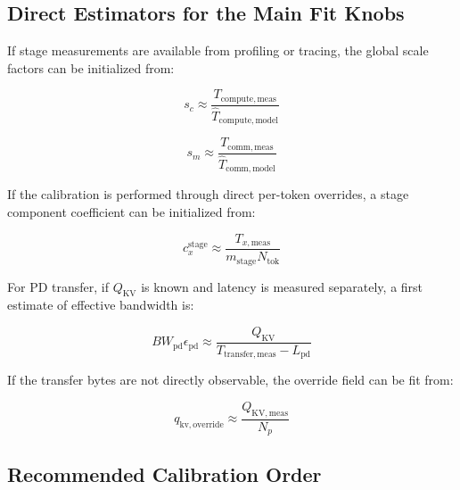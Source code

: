 \subsection{Direct Estimators for the Main Fit Knobs}

If stage measurements are available from profiling or tracing, the global scale
factors can be initialized from:

\begin{equation*}
s_c \approx
\frac{T_{\mathrm{compute,meas}}}
{\widehat{T}_{\mathrm{compute,model}}}
\end{equation*}

\begin{equation*}
s_m \approx
\frac{T_{\mathrm{comm,meas}}}
{\widehat{T}_{\mathrm{comm,model}}}
\end{equation*}

If the calibration is performed through direct per-token overrides, a stage
component coefficient can be initialized from:

\begin{equation*}
c_x^{\mathrm{stage}} \approx
\frac{T_{x,\mathrm{meas}}}
{m_{\mathrm{stage}} N_{\mathrm{tok}}}
\end{equation*}

For PD transfer, if \(Q_{\mathrm{KV}}\) is known and latency is measured
separately, a first estimate of effective bandwidth is:

\begin{equation*}
BW_{\mathrm{pd}} \epsilon_{\mathrm{pd}} \approx
\frac{Q_{\mathrm{KV}}}
{T_{\mathrm{transfer,meas}} - L_{\mathrm{pd}}}
\end{equation*}

If the transfer bytes are not directly observable, the override field can be
fit from:

\begin{equation*}
q_{\mathrm{kv,override}} \approx
\frac{Q_{\mathrm{KV,meas}}}{N_p}
\end{equation*}

\subsection{Recommended Calibration Order}

